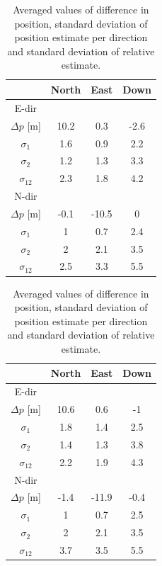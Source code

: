 \begin{table}[h!]
\begin{minipage}{0.45\linewidth}
  \begin{center} 
    \begin{tabular}{|c|c|c|c|}\hline
		& \textbf{North} & \textbf{East}& \textbf{Down}\\
      \hline
      	E-dir \\ \hline
      	$\Delta p $ [m]& 10.2 & 0.3 & -2.6\\ \hline
		$\sigma_1$& 1.6 & 0.9 & 2.2 \\\hline
		$\sigma_2$ & 1.2 &1.3 & 3.3 \\ \hline
		$\sigma_{12}$ & 2.3 & 1.8 & 4.2 \\ \hline
		N-dir\\ \hline
		$\Delta p $ [m]& -0.1& -10.5 & 0 \\ \hline
		$\sigma_1$& 1 & 0.7 & 2.4 \\\hline
		$\sigma_2$ & 2 &2.1 & 3.5 \\ \hline
		$\sigma_{12}$ & 2.5 & 3.3 & 5.5 \\ \hline
	\end{tabular}
  \end{center}
\end{minipage}
\hfill
\begin{minipage}{0.45\linewidth}
  \begin{center}
    \begin{tabular}{|c|c|c|c|}\hline
		& \textbf{North} & \textbf{East}& \textbf{Down}\\
      \hline
      	E-dir\\ \hline
      	$\Delta p $ [m]& 10.6& 0.6 & -1 \\ \hline 
		$\sigma_1$& 1.8 & 1.4 & 2.5 \\\hline
		$\sigma_2$ & 1.4 &1.3 & 3.8 \\ \hline
		$\sigma_{12}$ & 2.2 & 1.9 & 4.3 \\ \hline
		N-dir\\ \hline
		$\Delta p $ [m]& -1.4 & -11.9 & -0.4 \\ \hline
		$\sigma_1$& 1 & 0.7 & 2.5 \\ \hline
		$\sigma_2$ & 2 &2.1 & 3.5 \\ \hline
		$\sigma_{12}$ & 3.7 & 3.5 & 5.5 \\ \hline
    \end{tabular}
  \end{center}
\end{minipage}
\caption{Averaged values of difference in position, standard deviation of  position estimate per direction and standard deviation of relative estimate.}
\end{table}

